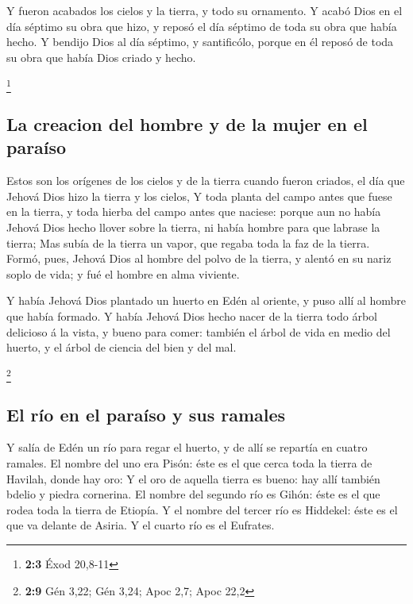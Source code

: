  Y fueron acabados los cielos y la tierra, y todo su
ornamento.  Y acabó Dios en el día séptimo su obra que
hizo, y reposó el día séptimo de toda su obra que había hecho.
 Y bendijo Dios al día séptimo, y santificólo, porque en
él reposó de toda su obra que había Dios criado y hecho.

\footnote{\textbf{2:3} Éxod 20,8-11}

\hypertarget{la-creacion-del-hombre-y-de-la-mujer-en-el-parauxedso}{%
\subsection{La creacion del hombre y de la mujer en el
paraíso}\label{la-creacion-del-hombre-y-de-la-mujer-en-el-parauxedso}}

 Estos son los orígenes de los cielos y de la tierra
cuando fueron criados, el día que Jehová Dios hizo la tierra y los
cielos,  Y toda planta del campo antes que fuese en la
tierra, y toda hierba del campo antes que naciese: porque aun no había
Jehová Dios hecho llover sobre la tierra, ni había hombre para que
labrase la tierra;  Mas subía de la tierra un vapor, que
regaba toda la faz de la tierra.  Formó, pues, Jehová Dios
al hombre del polvo de la tierra, y alentó en su nariz soplo de vida; y
fué el hombre en alma viviente.

 Y había Jehová Dios plantado un huerto en Edén al
oriente, y puso allí al hombre que había formado.  Y había
Jehová Dios hecho nacer de la tierra todo árbol delicioso á la vista, y
bueno para comer: también el árbol de vida en medio del huerto, y el
árbol de ciencia del bien y del mal.

\footnote{\textbf{2:9} Gén 3,22; Gén 3,24; Apoc 2,7; Apoc 22,2}

\hypertarget{el-ruxedo-en-el-parauxedso-y-sus-ramales}{%
\subsection{El río en el paraíso y sus
ramales}\label{el-ruxedo-en-el-parauxedso-y-sus-ramales}}

 Y salía de Edén un río para regar el huerto, y de allí
se repartía en cuatro ramales.  El nombre del uno era
Pisón: éste es el que cerca toda la tierra de Havilah, donde hay oro:
 Y el oro de aquella tierra es bueno: hay allí también
bdelio y piedra cornerina.  El nombre del segundo río es
Gihón: éste es el que rodea toda la tierra de Etiopía.  Y
el nombre del tercer río es Hiddekel: éste es el que va delante de
Asiria. Y el cuarto río es el Eufrates.

